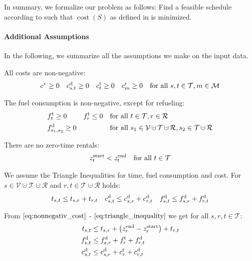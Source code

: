 In summary, we formalize our problem as follows: Find a feasible schedule according to  such that $\operatorname{cost}\left(S\right)$ as defined in  is minimized.

\paragraph{Additional Assumptions} \parfill

In the following, we summarize all the assumptions we make on the input data.

All costs are non-negative:
\begin{align}
\label{eq:nonnegativ_cost}
	c^{\operatorname{v}}\geq 0 && c^{\operatorname{d}}_{s,t}\geq 0 && c^{\operatorname{t}}_t\geq 0 && c^{\operatorname{r}}_m\geq 0 && \text{for all } s,t\in\mathcal{T}, m\in\mathcal{M}
\end{align}

The fuel consumption is non-negative, except for refueling:
\begin{align}
	& \ft_t\geq 0 && \ft_r\leq 0 && \text{for all } t\in\mathcal{T}, r\in\mathcal{R} \\
	& \fd_{s_1,s_2} \geq 0 &&&& \text{for all } s_1\in\mathcal{V}\cupdot\mathcal{T}\cupdot\mathcal{R},s_2\in\mathcal{T}\cupdot\mathcal{R}
\end{align}

There are no zero-time rentals:
\begin{align}
\label{eq:notime_trip}
	z^{\operatorname{start}}_t < z^{\operatorname{end}}_t && \text{for all } t\in\mathcal{T}
\end{align}

We assume the Triangle Inequalities for time, fuel consumption and cost. For \linebreak
${s\in\mathcal{V}\cupdot\mathcal{T}\cupdot\mathcal{R}}$ and $r,t\in\mathcal{T}\cupdot\mathcal{R}$ holds:
\begin{align}
\label{eq:triangle_inequality}
	t_{s,t} \leq t_{s,r} + t_{r,t} && c^{\operatorname{d}}_{s,t} \leq c^{\operatorname{d}}_{s,r} + c^{\operatorname{d}}_{r,t} && f^{\operatorname{d}}_{s,t} \leq f^{\operatorname{d}}_{s,r} + f^{\operatorname{d}}_{r,t}
\end{align}

From $\eqref{eq:nonnegativ_cost}$ - $\eqref{eq:triangle_inequality}$ we get for all $s,r,t\in\mathcal{T}$:
\begin{align}
	t_{s,t} & \leq t_{s,r} + \left(z^{\operatorname{end}}_r - z^{\operatorname{start}}_r\right) + t_{r,t} \label{eq:triangle_inequality_time} \\
	f^{\operatorname{d}}_{s,t} & \leq f^{\operatorname{d}}_{s,r} + f^{\operatorname{t}}_{r} + f^{\operatorname{d}}_{r,t} \label{eq:triangle_inequality_fuel} \\
	c^{\operatorname{d}}_{s,t} & \leq c^{\operatorname{d}}_{s,r} + c^{\operatorname{t}}_{r} + c^{\operatorname{d}}_{r,t} \label{eq:triangle_inequality_cost}
\end{align}

